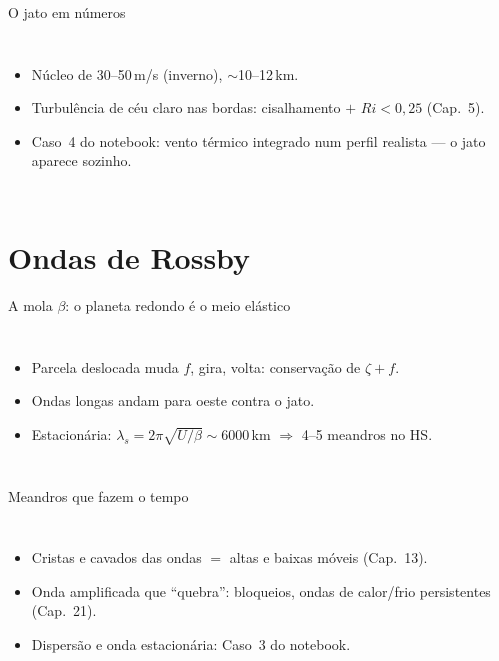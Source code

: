 \documentclass[aspectratio=169,11pt]{beamer}
\begin{document}
\begin{frame}{O jato em números}
  \begin{columns}
    \begin{itemize}
      \item Núcleo de 30--50\,m/s (inverno), $\sim$10--12\,km.
      \item Turbulência de céu claro nas bordas: cisalhamento $+$
            $Ri < 0{,}25$ (Cap.~5).
      \item Caso~4 do notebook: vento térmico integrado num perfil
            realista — o jato aparece sozinho.
    \end{itemize}
  \end{columns}
\end{frame}

\section{Ondas de Rossby}

\begin{frame}{A mola $\beta$: o planeta redondo é o meio elástico}
  \begin{columns}
    \vspace{0.4em}
    \begin{itemize}
      \item Parcela deslocada muda $f$, gira, volta: conservação de
            $\zeta + f$.
      \item Ondas longas andam para \alert{oeste} contra o jato.
      \item Estacionária: $\lambda_s = 2\pi\sqrt{U/\beta} \sim
            6000$\,km $\Rightarrow$ 4--5 meandros no HS.
    \end{itemize}
  \end{columns}
\end{frame}

\begin{frame}{Meandros que fazem o tempo}
  \begin{columns}
    \begin{itemize}
      \item Cristas e cavados das ondas $=$ altas e baixas móveis
            (Cap.~13).
      \item Onda amplificada que ``quebra'': bloqueios, ondas de
            calor/frio persistentes (Cap.~21).
      \item Dispersão e onda estacionária: Caso~3 do notebook.
    \end{itemize}
  \end{columns}
\end{frame}
\end{document}
